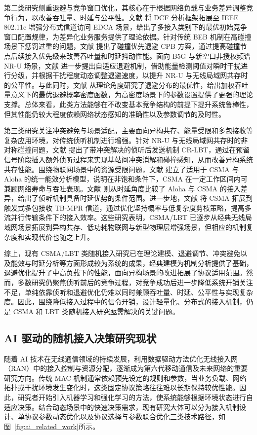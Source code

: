第二类研究侧重退避与竞争窗口优化，其核心在于根据网络负载与业务差异调整竞争行为，以改善吞吐量、时延与公平性。文献 \cite{2014_GaoEDCA} 将 DCF 分析框架拓展至 IEEE 802.11e 增强分布式信道访问 EDCA 场景，给出了多接入类别下的最优初始竞争窗口配置规律，为差异化业务服务提供了理论依据。针对传统 BEB 机制在高碰撞场景下惩罚过重的问题，文献\cite{2023_KimCPB} 提出了碰撞优先退避 CPB 方案，通过提高碰撞节点后续接入优先级来改善吞吐量和时延抖动性能。面向 B5G 与新空口非授权频谱 NR-U 场景，文献\cite{2023_ZhouAdaptiveLBT} 进一步提出自适应退避机制，借助能量检测阈值对瞬时干扰进行分级，并根据干扰程度动态调整退避速度，以提升 NR-U 与无线局域网共存时的公平性。与此同时，文献\cite{2024_CordeschiOptBackoff} 从理论角度研究了退避分布的最优性，给出加权吞吐量意义下的最优退避概率密度函数，为高密度场景下的参数设置提供了更强的理论支撑。总体来看，此类方法能够在不改变基本竞争结构的前提下提升系统鲁棒性，但其性能仍较大程度依赖网络状态感知的准确性以及参数调节的及时性。

第三类研究关注冲突避免与场景适配，主要面向异构共存、能量受限和多包接收等复杂应用环境，对传统侦听机制进行增强。针对 NR-U 与无线局域网共存时的非对称碰撞问题，文献\cite{2022_LoginovCRLBT} 提出了带冲突解决的侦听后发送机制 CR-LBT，通过在预留信号阶段插入额外侦听过程来实现基站间冲突消解和碰撞感知，从而改善异构系统共存性能。围绕物联网场景中的资源受限问题，文献\cite{2026_YuanCSMAEnergy} 建立了适用于 CSMA 与 Aloha 的统一能效分析模型，说明在非饱和条件下，CSMA 在一定工作区间内可兼顾网络寿命与吞吐表现。文献\cite{2025_ZhaoCSMADelay} 则从时延角度比较了 Aloha 与 CSMA 的接入差异，给出了侦听机制具备时延优势的条件范围。进一步地，文献\cite{2024_CordeschiMPRCSMA} 将 CSMA 拓展到触发式多包接收 TB-MPR 信道，通过优化坚持概率与低复杂度剪枝策略，提高多流并行传输条件下的接入效率。这些研究表明，CSMA/LBT 已逐步从经典无线局域网场景拓展到异构共存、低功耗物联网与新型物理层增强场景，但相应的机制复杂度和实现代价也随之上升。

综上，现有 CSMA/LBT 类随机接入研究已在理论建模、退避调节、冲突避免以及能效与时延分析等方面形成较为系统的成果，经典建模为机制分析提供了基础，退避优化提升了中高负载下的性能，面向异构场景的改进拓展了协议适用范围。然而，多数研究仍聚焦侦听前后的竞争过程，对竞争成功后进一步降低系统开销关注不足，单纯依靠侦听和退避优化仍难以同时兼顾吞吐量、时延、公平性与实现复杂度。因此，围绕降低接入过程中的信令开销，设计轻量化、分布式的接入机制，仍是 CSMA 和 LBT 类随机接入研究亟需解决的关键问题。


\subsection{AI 驱动的随机接入决策研究现状}
随着 AI 技术在无线通信领域的持续发展，利用数据驱动方法优化无线接入网（RAN）中的接入控制与资源分配，逐渐成为第六代移动通信及未来网络的重要研究方向。传统 MAC 机制通常依赖预先设定的规则和参数，当业务负载、网络拓扑或干扰环境发生变化时，这类固定协议策略往往难以长期保持较优性能。因此，研究者开始引入机器学习和强化学习的方法，使系统能够根据环境状态进行自适应决策。结合动态场景中的快速决策需求，现有研究大体可以分为接入机制设计、单协议参数动态优化以及协议选择与参数联合优化三类技术路径，如图~\ref{fig:ai_related_work}所示。


